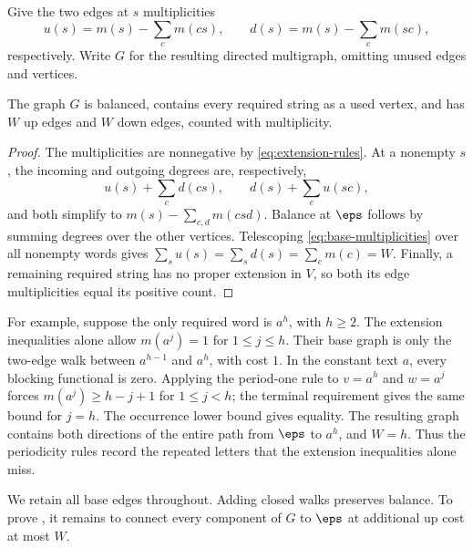 Give the two edges at $s$ multiplicities
\begin{equation}\label{eq:base-multiplicities}
u(s)=m(s)-\sum_c m(cs),\qquad
d(s)=m(s)-\sum_c m(sc),
\end{equation}
respectively. Write $G$ for the resulting directed multigraph, omitting unused edges and vertices.

\begin{lemma}\label{lem:base}
The graph $G$ is balanced, contains every required string as a used vertex, and has $W$ up edges and $W$ down edges, counted with multiplicity.
\end{lemma}

\begin{proof}
The multiplicities are nonnegative by \eqref{eq:extension-rules}. At a nonempty $s$, the incoming and outgoing degrees are, respectively,
\[
u(s)+\sum_c d(cs),\qquad d(s)+\sum_c u(sc),
\]
and both simplify to $m(s)-\sum_{c,d}m(csd)$. Balance at $\eps$ follows by summing degrees over the other vertices. Telescoping \eqref{eq:base-multiplicities} over all nonempty words gives $\sum_s u(s)=\sum_s d(s)=\sum_c m(c)=W$. Finally, a remaining required string has no proper extension in $V$, so both its edge multiplicities equal its positive count.
\end{proof}

For example, suppose the only required word is $a^h$, with $h\ge2$. The extension inequalities alone allow $m(a^j)=1$ for $1\le j\le h$. Their base graph is only the two-edge walk between $a^{h-1}$ and $a^h$, with cost $1$. In the constant text $a$, every blocking functional is zero. Applying the period-one rule to $v=a^h$ and $w=a^j$ forces $m(a^j)\ge h-j+1$ for $1\le j<h$; the terminal requirement gives the same bound for $j=h$. The occurrence lower bound gives equality. The resulting graph contains both directions of the entire path from $\eps$ to $a^h$, and $W=h$. Thus the periodicity rules record the repeated letters that the extension inequalities alone miss.

We retain all base edges throughout. Adding closed walks preserves balance. To prove , it remains to connect every component of $G$ to $\eps$ at additional up cost at most $W$.

